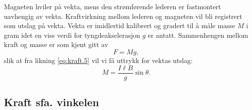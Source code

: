 \documentclass[../Elmag-labhefte-2020.tex]{subfiles}
\begin{document}
Magneten hviler på vekta, mens den strømførende lederen er fastmontert uavhengig av vekta. Kraftvirkning mellom lederen og magneten vil bli registrert som utslag på vekta. Vekta er imidlertid kalibrert og gradert til å måle masse $M$ i gram idet en viss verdi for tyngdeakselerasjon $g$ er antatt. Sammenhengen mellom kraft og masse er som kjent gitt av 
\begin{equation}
    F = M g, 
    \label{eq:kraft.7}
\end{equation}
slik at fra likning \eqref{eq:kraft.5} vil vi få uttrykk for vektas utslag:
\begin{equation}
    M = \frac{I \ell B}{g} \sin \theta.
    \label{eq:kraft.8}
\end{equation}






\subsection{Kraft sfa. vinkelen  \label{ch.kraft.beregn3}}
\end{document}
